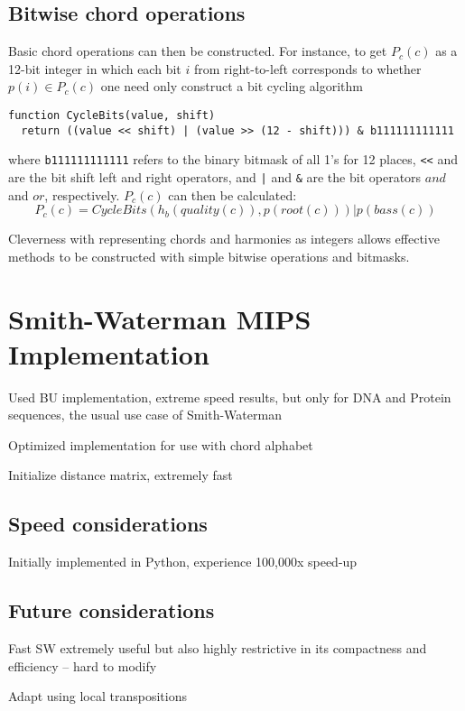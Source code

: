 \subsection{Bitwise chord operations}

Basic chord operations can then be constructed. For instance, to get $P_c(c)$ as a 12-bit integer in which each bit $i$ from right-to-left corresponds to whether $p(i) \in P_c(c)$ one need only construct a bit cycling algorithm
\begin{verbatim}
function CycleBits(value, shift)
  return ((value << shift) | (value >> (12 - shift))) & b111111111111
\end{verbatim}
where \texttt{b111111111111} refers to the binary bitmask of all 1's for 12 places, \texttt{<<} and \text{>>} are the bit shift left and right operators, and \texttt{|} and \texttt{&} are the bit operators $and$ and $or$, respectively. $P_c(c)$ can then be calculated: \[ P_c(c) = CycleBits(h_b(quality(c)), p(root(c))) | p(bass(c)) \]

Cleverness with representing chords and harmonies as integers allows effective methods to be constructed with simple bitwise operations and bitmasks.

\section{Smith-Waterman MIPS Implementation}

\item Used BU implementation, extreme speed results, but only for DNA and Protein sequences, the usual use case of Smith-Waterman

\item Optimized implementation for use with chord alphabet

\item Initialize distance matrix, extremely fast

\subsection{Speed considerations}

\item Initially implemented in Python, experience 100,000x speed-up

\subsection{Future considerations}

\item Fast SW extremely useful but also highly restrictive in its compactness and efficiency -- hard to modify

\item Adapt using local transpositions